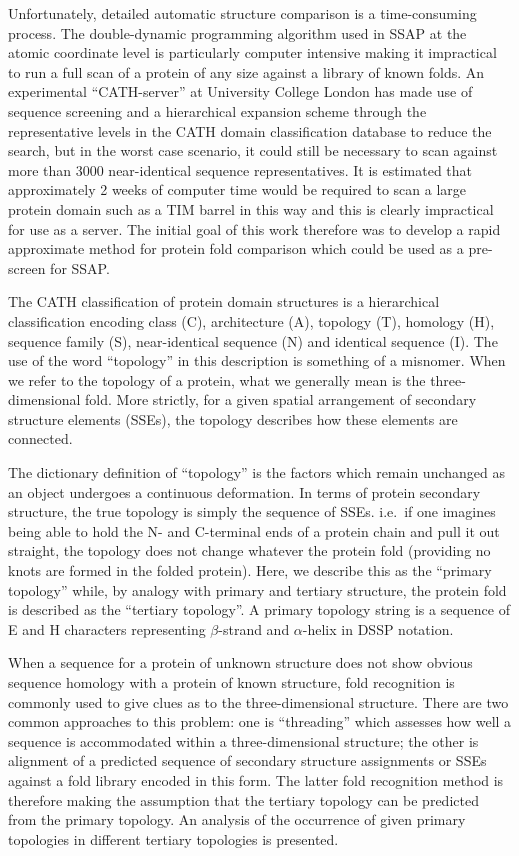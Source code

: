 \documentclass{article}
\begin{document}
Unfortunately, detailed automatic structure comparison is a
time-consuming process. The double-dynamic programming algorithm used
in SSAP\cite{taylor:alignment} at the atomic coordinate level is
particularly computer intensive making it impractical to run a full
scan of a protein of any size against a library of known folds.  An
experimental ``CATH-server'' at University College
London\cite{orengo:classifying} has made use of sequence screening and
a hierarchical expansion scheme through the representative levels in
the CATH domain classification database\cite{orengo:cath} to reduce
the search, but in the worst case scenario, it could still be
necessary to scan against more than 3000 near-identical sequence
representatives. It is estimated that approximately 2 weeks of computer time
would be required to scan a large protein domain such as a TIM barrel
in this way and this is clearly impractical for use as a server. The
initial goal of this work therefore was to develop a rapid approximate
method for protein fold comparison which could be used as a pre-screen
for SSAP.

The CATH classification of protein domain structures is a hierarchical
classification encoding class (C), architecture (A), topology (T),
homology (H), sequence family (S), near-identical sequence (N) and
identical sequence (I). The use of the word ``topology'' in this
description is something of a misnomer. When we refer to the topology
of a protein, what we generally mean is the three-dimensional
fold. More strictly, for a given spatial arrangement of secondary
structure elements (SSEs), the topology describes how these elements
are connected.

The dictionary definition of ``topology'' is the factors which remain
unchanged as an object undergoes a continuous deformation.  In terms
of protein secondary structure, the true topology is simply the
sequence of SSEs.  i.e.\ if one imagines being able to hold the N- and
C-terminal ends of a protein chain and pull it out straight, the
topology does not change whatever the protein fold (providing no knots
are formed in the folded protein).  Here, we describe this as the
``primary topology'' while, by analogy with primary and tertiary
structure, the protein fold is described as the ``tertiary
topology''. A primary topology string is a sequence of E and H
characters representing $\beta$-strand and $\alpha$-helix in DSSP
notation\cite{kabsch:dictionary}.

When a sequence for a protein of unknown structure does not show
obvious sequence homology with a protein of known structure, fold
recognition is commonly used to give clues as to the three-dimensional
structure. There are two common approaches to this problem: one is
``threading'' which assesses how well a sequence is accommodated
within a three-dimensional structure\cite[for
example]{jones:threading}; the other is alignment of a predicted
sequence of secondary structure assignments\cite{rost:foldrec} or
SSEs\cite{russell:foldrec} against a fold library encoded in this
form.  The latter fold recognition method is therefore making the
assumption that the tertiary topology can be predicted from the
primary topology. An analysis of the occurrence of given primary
topologies in different tertiary topologies is presented.
\end{document}
